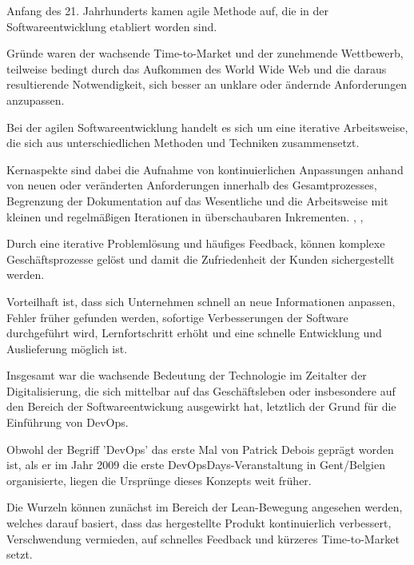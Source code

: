 Anfang des 21. Jahrhunderts kamen agile Methode auf, die in der Softwareentwicklung etabliert worden sind. 

Gründe waren der wachsende Time-to-Market und der zunehmende Wettbewerb, teilweise bedingt durch das Aufkommen des World Wide Web und die daraus resultierende Notwendigkeit, sich besser an unklare oder ändernde Anforderungen anzupassen. \cite{haffke_transformative_2017} 

Bei der agilen Softwareentwicklung handelt es sich um eine iterative Arbeitsweise, die sich aus  unterschiedlichen Methoden und Techniken zusammensetzt.

Kernaspekte sind dabei die Aufnahme von kontinuierlichen Anpassungen anhand von neuen oder veränderten Anforderungen innerhalb des Gesamtprozesses, Begrenzung der Dokumentation auf das Wesentliche und die Arbeitsweise mit kleinen und regelmäßigen Iterationen in überschaubaren Inkrementen. \cite{cohen_introduction_2004}, \cite{bakaji_waterfall_2012}, \cite[S. 18]{ravichandran_devops_2016}

Durch eine iterative Problemlösung und häufiges Feedback, können komplexe Geschäftsprozesse gelöst und damit die Zufriedenheit der Kunden sichergestellt werden. 

Vorteilhaft ist, dass sich Unternehmen schnell an neue Informationen anpassen, Fehler früher gefunden werden, sofortige Verbesserungen der Software durchgeführt wird, Lernfortschritt erhöht und eine schnelle Entwicklung und Auslieferung möglich ist. \cite[S. 18]{ravichandran_devops_2016}

Insgesamt war die wachsende Bedeutung der Technologie im Zeitalter der Digitalisierung, die sich mittelbar auf das Geschäftsleben oder insbesondere auf den Bereich der Softwareentwickung ausgewirkt hat, letztlich der Grund für die Einführung von DevOps. \cite{haffke_transformative_2017} 

Obwohl der Begriff 'DevOps' das erste Mal von Patrick Debois geprägt worden ist, als er im Jahr 2009 die erste DevOpsDays-Veranstaltung in Gent/Belgien organisierte, liegen die Ursprünge dieses Konzepts weit früher. \cite[S.3]{kim_devops-handbuch_2017}  

Die Wurzeln können zunächst im Bereich der Lean-Bewegung angesehen werden, welches darauf basiert, dass das hergestellte Produkt kontinuierlich verbessert, Verschwendung vermieden, auf schnelles Feedback und kürzeres Time-to-Market setzt. \cite[S.2]{kim_devops-handbuch_2017} \cite{nelson_devops_2016} \cite[S. 11]{ravichandran_devops_2016}

